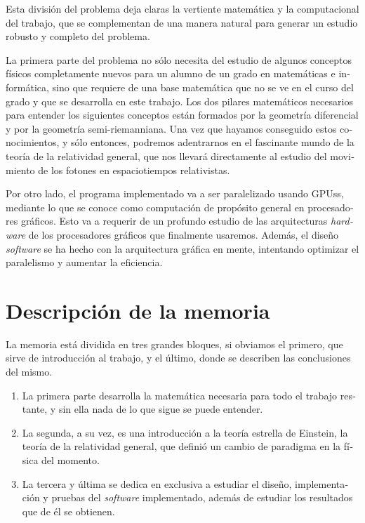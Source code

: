 \begin{otherlanguage}{spanish}
Esta división del problema deja claras la vertiente matemática y la computacional del trabajo, que se complementan de una manera natural para generar un estudio robusto y completo del problema.

La primera parte del problema no sólo necesita del estudio de algunos conceptos físicos completamente nuevos para un alumno de un grado en matemáticas e informática, sino que requiere de una base matemática que no se ve en el curso del grado y que se desarrolla en este trabajo. Los dos pilares matemáticos necesarios para entender los siguientes conceptos están formados por la geometría diferencial y por la geometría semi-riemanniana. Una vez que hayamos conseguido estos conocimientos, y sólo entonces, podremos adentrarnos en el fascinante mundo de la teoría de la relatividad general, que nos llevará directamente al estudio del movimiento de los fotones en espaciotiempos relativistas.

Por otro lado, el programa implementado va a ser paralelizado usando \acp{GPU}s, mediante lo que se conoce como computación de propósito general en procesadores gráficos. Esto va a requerir de un profundo estudio de las arquitecturas \emph{hardware} de los procesadores gráficos que finalmente usaremos. Además, el diseño \emph{software} se ha hecho con la arquitectura gráfica en mente, intentando optimizar el paralelismo y aumentar la eficiencia.

\section*{Descripción de la memoria}

La memoria está dividida en tres grandes bloques, si obviamos el primero, que sirve de introducción al trabajo, y el último, donde se describen las conclusiones del mismo.

\begin{enumerate}
	\item La primera parte desarrolla la matemática necesaria para todo el trabajo restante, y sin ella nada de lo que sigue se puede entender.
	\item La segunda, a su vez, es una introducción a la teoría estrella de Einstein, la teoría de la relatividad general, que definió un cambio de paradigma en la física del momento.
	\item La tercera y última se dedica en exclusiva a estudiar el diseño, implementación y pruebas del \emph{software} implementado, además de estudiar los resultados que de él se obtienen.
\end{enumerate}


\end{otherlanguage}
